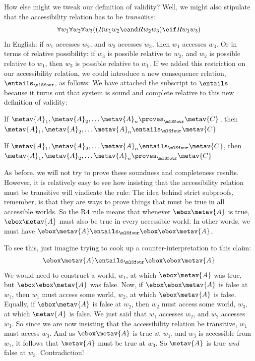 How else might we tweak our definition of validity? Well, we might also stipulate that the accessibility relation has to be \emph{transitive}:
\[\forall w_1\forall w_2\forall w_3 ((Rw_1w_2 \eand Rw_2w_3)\eif Rw_1w_3)\]
In English: if $w_1$ accesses $w_2$, and $w_2$ accesses $w_3$, then $w_1$ accesses $w_3$. Or in terms of relative possibility: if $w_3$ is possible relative to $w_2$, and $w_2$ is possible relative to $w_1$, then $w_3$ is possible relative to $w_1$. If we added this restriction on our accessibility relation, we could introduce a new consequence relation, $\entails_\mlSfour$, as follows:
We have attached the \mlSfour{} subscript to $\entails$ because it turns out that system \mlSfour{} is sound and complete relative to this new definition of validity:
\begin{compactlist}
	\item If $\metav{A}_1,\metav{A}_2, \dots \metav{A}_n\proves_\mlSfour\metav{C}$, then $\metav{A}_1,\metav{A}_2, \dots \metav{A}_n\entails_\mlSfour\metav{C}$
	\item If $\metav{A}_1,\metav{A}_2, \dots \metav{A}_n\entails_\mlSfour\metav{C}$, then $\metav{A}_1,\metav{A}_2, \dots \metav{A}_n\proves_\mlSfour\metav{C}$
\end{compactlist}
As before, we will not try to prove these soundness and completeness results. However, it is relatively easy to see how insisting that the accessibility relation must be transitive will vindicate the \mlSfour{} rule:
The idea behind strict subproofs, remember, is that they are ways to prove things that must be true in all accessible worlds. So the R$\mathbf{4}$ rule means that whenever $\ebox \metav{A}$ is true, $\ebox \metav{A}$ must also be true in every accessible world. In other words, we must have $\ebox\metav{A} \entails_\mlSfour \ebox\ebox\metav{A}$.

To see this, just imagine trying to cook up a counter-interpretation to this claim:
\[\ebox\metav{A} \entails_\mlSfour \ebox \ebox \metav{A}\]
We would need to construct a world, $w_1$, at which $\ebox\metav{A}$ was true, but $\ebox \ebox \metav{A}$ was false. Now, if $\ebox \ebox \metav{A}$ is false at $w_1$, then $w_1$ must access some world, $w_2$, at which $\ebox\metav{A}$ is false. Equally, if $\ebox \metav{A}$ is false at $w_2$, then $w_2$ must access some world, $w_3$, at which $\metav{A}$ is false. We just said that $w_1$ accesses $w_2$, and $w_2$ accesses $w_3$. So since we are now insisting that the accessibility relation be transitive, $w_1$ must access $w_3$. And as $\ebox\metav{A}$ is true at $w_1$, and $w_3$ is accessible from $w_1$, it follows that $\metav{A}$ must be true at $w_3$. So $\metav{A}$ is true \emph{and} false at $w_3$. Contradiction!

